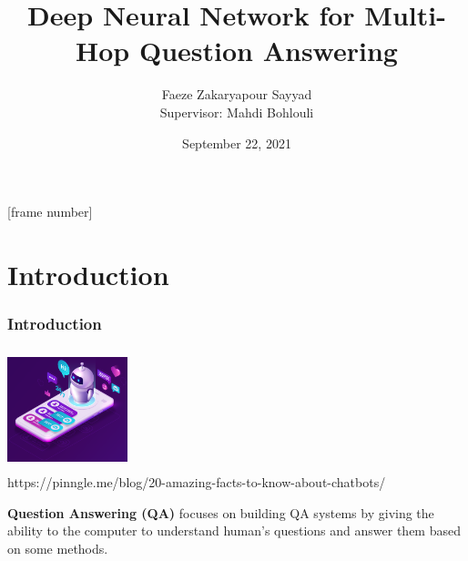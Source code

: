 \documentclass[]{beamer}
\title{Deep Neural Network for Multi-Hop Question Answering}
\author{Faeze Zakaryapour Sayyad \\ {\tiny Supervisor: Mahdi Bohlouli } }
\institute{The Institute for Advanced Studies in Basic Sciences}
\date{September 22, 2021}  %
\begin{document}
[frame number]

\begin{frame}
  \titlepage
\end{frame}

\section[Outline]{}

\begin{frame}
  \tableofcontents
\end{frame}


\section{Introduction}

\begin{frame}
\frametitle{Introduction}   %


\begin{minipage}{4cm}
\includegraphics[height=3.5cm, width=3.5cm]{1.png} \\
\centering
\tiny{ { \color{gray} https://pinngle.me/blog/20-amazing-facts-to-know-about-chatbots/}}

\end{minipage}%
\begin{minipage}{7cm}
\textbf{Question Answering (QA)}  focuses on building QA systems by giving the ability to the computer to understand human’s questions and answer them based on some methods.

\end{minipage}
  
\end{frame}
\end{document}
